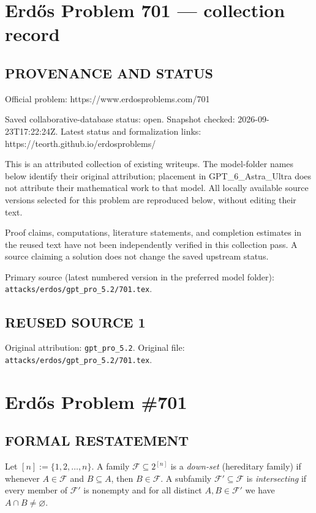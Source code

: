 \section*{Erd\H{o}s Problem 701 --- collection record}

\subsection*{PROVENANCE AND STATUS}
Official problem: https://www.erdosproblems.com/701

Saved collaborative-database status: open.
Snapshot checked: 2026-09-23T17:22:24Z.
Latest status and formalization links: https://teorth.github.io/erdosproblems/

This is an attributed collection of existing writeups. The model-folder names below identify their original attribution; placement in GPT\_6\_Astra\_Ultra does not attribute their mathematical work to that model. All locally available source versions selected for this problem are reproduced below, without editing their text.

Proof claims, computations, literature statements, and completion estimates in the reused text have not been independently verified in this collection pass. A source claiming a solution does not change the saved upstream status.

Primary source (latest numbered version in the preferred model folder): \texttt{attacks/erdos/gpt\_pro\_5.2/701.tex}.

\subsection*{REUSED SOURCE 1}
Original attribution: \texttt{gpt\_pro\_5.2}.
Original file: \texttt{attacks/erdos/gpt\_pro\_5.2/701.tex}.

\section*{Erd\H{o}s Problem \#701}

\subsection*{FORMAL RESTATEMENT}
Let $[n]:=\{1,2,\dots,n\}$.
A family $\mathcal{F}\subseteq 2^{[n]}$ is a \emph{down-set} (hereditary family) if whenever $A\in\mathcal{F}$ and $B\subseteq A$, then $B\in\mathcal{F}$.
A subfamily $\mathcal{F}'\subseteq \mathcal{F}$ is \emph{intersecting} if every member of $\mathcal{F}'$ is nonempty and for all distinct $A,B\in\mathcal{F}'$ we have $A\cap B\ne\varnothing$.

